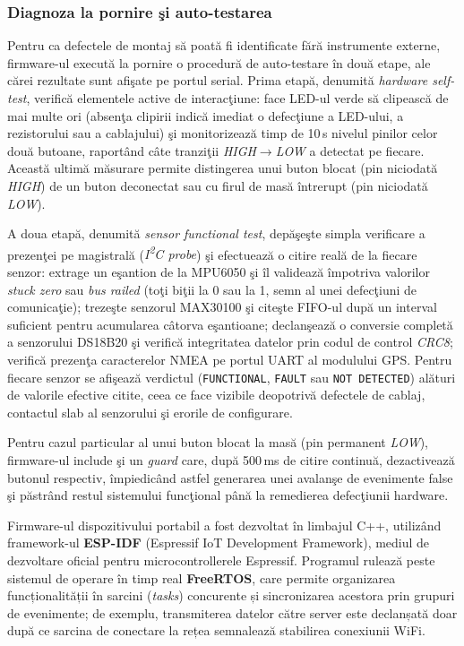 \documentclass[12pt,a4paper]{article}
\begin{document}
\subsubsection{Diagnoza la pornire şi auto-testarea}

Pentru ca defectele de montaj să poată fi identificate fără instrumente externe, firmware-ul execută la pornire o procedură de auto-testare în două etape, ale cărei rezultate sunt afişate pe portul serial. Prima etapă, denumită \textit{hardware self-test}, verifică elementele active de interacţiune: face LED-ul verde să clipească de mai multe ori (absenţa clipirii indică imediat o defecţiune a LED-ului, a rezistorului sau a cablajului) şi monitorizează timp de 10\,s nivelul pinilor celor două butoane, raportând câte tranziţii \textit{HIGH$\rightarrow$LOW} a detectat pe fiecare. Această ultimă măsurare permite distingerea unui buton blocat (pin niciodată \textit{HIGH}) de un buton deconectat sau cu firul de masă întrerupt (pin niciodată \textit{LOW}).

A doua etapă, denumită \textit{sensor functional test}, depăşeşte simpla verificare a prezenţei pe magistrală (\textit{I\textsuperscript{2}C probe}) şi efectuează o citire reală de la fiecare senzor: extrage un eşantion de la MPU6050 şi îl validează împotriva valorilor \textit{stuck zero} sau \textit{bus railed} (toţi biţii la 0 sau la 1, semn al unei defecţiuni de comunicaţie); trezeşte senzorul MAX30100 şi citeşte FIFO-ul după un interval suficient pentru acumularea câtorva eşantioane; declanşează o conversie completă a senzorului DS18B20 şi verifică integritatea datelor prin codul de control \textit{CRC8}; verifică prezenţa caracterelor NMEA pe portul UART al modulului GPS. Pentru fiecare senzor se afişează verdictul (\texttt{FUNCTIONAL}, \texttt{FAULT} sau \texttt{NOT DETECTED}) alături de valorile efective citite, ceea ce face vizibile deopotrivă defectele de cablaj, contactul slab al senzorului şi erorile de configurare.

Pentru cazul particular al unui buton blocat la masă (pin permanent \textit{LOW}), firmware-ul include şi un \textit{guard} care, după 500\,ms de citire continuă, dezactivează butonul respectiv, împiedicând astfel generarea unei avalanşe de evenimente false şi păstrând restul sistemului funcţional până la remedierea defecţiunii hardware.



Firmware-ul dispozitivului portabil a fost dezvoltat în limbajul C++, utilizând framework-ul \textbf{ESP-IDF} (Espressif IoT Development Framework), mediul de dezvoltare oficial pentru microcontrollerele Espressif. Programul rulează peste sistemul de operare în timp real \textbf{FreeRTOS}, care permite organizarea funcționalității în sarcini (\textit{tasks}) concurente și sincronizarea acestora prin grupuri de evenimente; de exemplu, transmiterea datelor către server este declanșată doar după ce sarcina de conectare la rețea semnalează stabilirea conexiunii WiFi.
\end{document}
